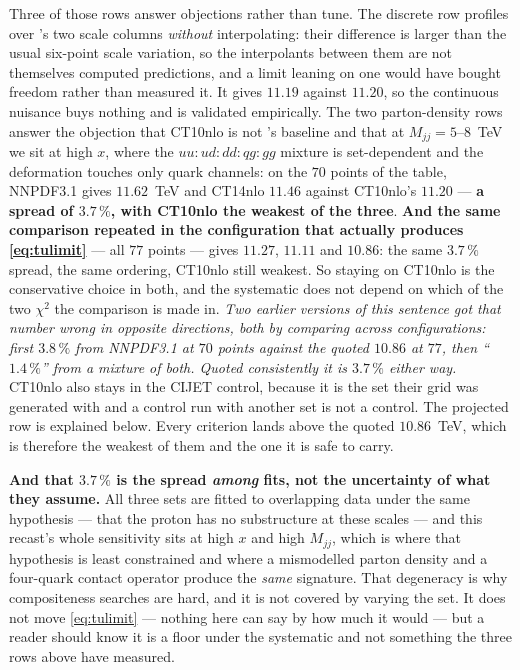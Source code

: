 \documentclass[11pt,a4paper]{article}
\begin{document}
\noindent Three of those rows answer objections rather than tune. The discrete row profiles over
\cite{CMSangular}'s two scale columns \emph{without} interpolating: their difference is larger than
the usual six-point scale variation, so the interpolants between them are not themselves computed
predictions, and a limit leaning on one would have bought freedom rather than measured it. It gives
$11.19$ against $11.20$, so the continuous nuisance buys nothing and is validated empirically. The
two parton-density rows answer the objection that CT10nlo is not \cite{CMSangular}'s baseline and
that at $M_{jj}=5$--$8$~TeV we sit at high $x$, where the $uu\!:\!ud\!:\!dd\!:\!qg\!:\!gg$ mixture
is set-dependent and the deformation touches only quark channels: on the $70$ points of the table,
NNPDF3.1 gives $11.62$~TeV and CT14nlo $11.46$ against CT10nlo's $11.20$ --- \textbf{a spread of
$3.7\,\%$, with CT10nlo the weakest of the three}. \textbf{And the same comparison repeated in the
configuration that actually produces \eqref{eq:tulimit}} --- all $77$ points --- gives $11.27$,
$11.11$ and $10.86$: the same $3.7\,\%$ spread, the same ordering, CT10nlo still weakest. So
staying on CT10nlo is the conservative choice in both, and the systematic does not depend on which
of the two $\chi^2$ the comparison is made in. \emph{Two earlier versions of this sentence got that
number wrong in opposite directions, both by comparing across configurations: first $3.8\,\%$ from
NNPDF3.1 at $70$ points against the quoted $10.86$ at $77$, then ``$1.4\,\%$'' from a mixture of
both. Quoted consistently it is $3.7\,\%$ either way.} CT10nlo also stays in the CIJET
control, because it is the set their grid was generated with and a control run with another set is
not a control. The projected row is explained below. Every criterion lands above the quoted
$10.86$~TeV, which is therefore the weakest of them and the one it is safe to carry.

\noindent\textbf{And that $3.7\,\%$ is the spread \emph{among} fits, not the uncertainty of what
they assume.} All three sets are fitted to overlapping data under the same hypothesis --- that the
proton has no substructure at these scales --- and this recast's whole sensitivity sits at high $x$
and high $M_{jj}$, which is where that hypothesis is least constrained and where a mismodelled
parton density and a four-quark contact operator produce the \emph{same} signature. That
degeneracy is why compositeness searches are hard, and it is not covered by varying the set. It
does not move \eqref{eq:tulimit} --- nothing here can say by how much it would --- but a reader
should know it is a floor under the systematic and not something the three rows above have
measured.
\end{document}

